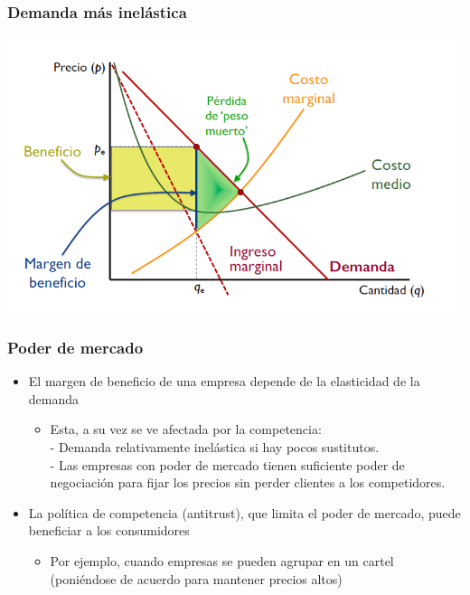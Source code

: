 \documentclass{beamer}
\begin{document}
\begin{frame}
\frametitle{Demanda más inelástica}
\includegraphics[scale=0.6]{Slides Principios de Economia/Figures/Tema_06.48_elasticidad4.png}
\end{frame}

\begin{frame}
\frametitle{Poder de mercado}
\begin{itemize}
    \item El margen de beneficio de una empresa depende de la elasticidad de la demanda\vspace{2mm}
    \begin{itemize}
        \item Esta, a su vez se ve afectada por la competencia: \\
        - Demanda relativamente inelástica si hay pocos sustitutos. \\
        - Las empresas con poder de mercado tienen suficiente poder de negociación para fijar los precios sin perder clientes a los competidores.\vspace{4mm}
    \end{itemize}
    \item La política de competencia (antitrust), que limita el poder de mercado, puede beneficiar a los consumidores\vspace{2mm}
    \begin{itemize}
        \item Por ejemplo, cuando empresas se pueden agrupar en un cartel (poniéndose de acuerdo para mantener precios altos)
    \end{itemize}
\end{itemize}
\end{frame}
\end{document}
